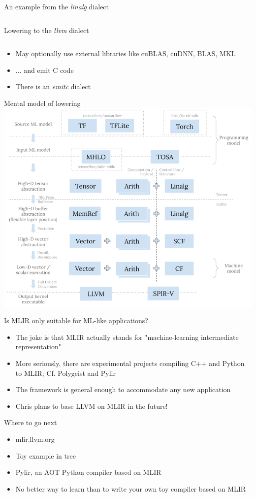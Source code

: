 \documentclass{beamer}
\begin{document}
\begin{frame}{An example from the \emph{linalg} dialect}
  \inputminted[linenos, fontsize=\footnotesize]{text}{res/linalg.mlir}
\end{frame}
\begin{frame}{Lowering to the \emph{llvm} dialect}
  \inputminted[linenos, fontsize=\footnotesize]{text}{res/llvm.mlir}
\end{frame}
\begin{frame}
  \begin{itemize}
    \item May optionally use external libraries like cuBLAS, cuDNN, BLAS, MKL
    \item ... and emit C code
    \item There is an \emph{emitc} dialect
  \end{itemize}
\end{frame}
\begin{frame}{Mental model of lowering}
  \includegraphics[scale=0.5]{res/lowering}
\end{frame}
\begin{frame}{Is MLIR only suitable for ML-like applications?}
  \begin{itemize}
    \item The joke is that MLIR actually stands for "machine-learning intermediate representation"
    \item More seriously, there are experimental projects compiling C++ and Python to MLIR; Cf. Polygeist and Pylir
    \item The framework is general enough to accommodate any new application
    \item Chris plans to base LLVM on MLIR in the future!
  \end{itemize}
\end{frame}
\begin{frame}{Where to go next}
  \begin{itemize}
    \item mlir.llvm.org
    \item Toy example in tree
    \item Pylir, an AOT Python compiler based on MLIR
    \item No better way to learn than to write your own toy compiler based on MLIR
  \end{itemize}
\end{frame}
\end{document}

